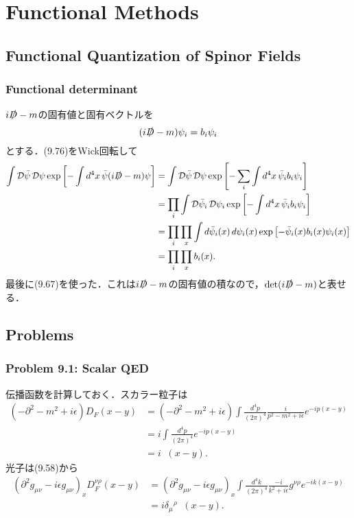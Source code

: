 \renewcommand\theequation{\arabic{chapter}.\arabic{section}.\arabic{equation}}
\setcounter{chapter}{8}
\chapter{Functional Methods}
\setcounter{section}{4}
\section{Functional Quantization of Spinor Fields}
\subsection{Functional determinant}
$i\slashed{D}-m$の固有値と固有ベクトルを
\[ (i\slashed{D}-m)\psi_i = b_i \psi_i \]
とする．(9.76)をWick回転して
\begin{align*}
  \int\mathcal{D}\bar\psi \, \mathcal{D}\psi \exp \left[ - \int d^4x \, \bar\psi (i\slashed{D}-m)\psi \right]
  &= \int\mathcal{D}\bar\psi \, \mathcal{D}\psi \exp \left[ - \sum_i \int d^4x \, \bar\psi_i b_i \psi_i \right] \\
  &= \prod_i \int\mathcal{D}\bar\psi_i \, \mathcal{D}\psi_i \exp \left[ - \int d^4x \, \bar\psi_i b_i \psi_i \right] \\
  &= \prod_i \prod_x \int d\bar\psi_i(x) \, d\psi_i(x) \exp \left[ - \bar\psi_i(x) b_i(x) \psi_i(x) \right] \\
  &= \prod_i \prod_x b_i(x) .
\end{align*}
最後に(9.67)を使った．これは$i\slashed{D}-m$の固有値の積なので，$\det(i\slashed{D}-m)$と表せる．

\section*{Problems}
\subsection{Problem 9.1: Scalar QED}
伝播函数を計算しておく．スカラー粒子は
\begin{align*}
  (-\partial^2 - m^2 + i\epsilon) D_F(x-y) &= (-\partial^2 - m^2 + i\epsilon) \int \frac{d^4p}{(2\pi)^4}
  \frac{i}{p^2 - m^2 + i\epsilon} e^{-ip(x-y)} \\
  &= i \int \frac{d^4p}{(2\pi)^4} e^{-ip(x-y)} \\
  &= i \mathop{\delta^{(4)}} (x-y) .
\end{align*}
光子は(9.58)から
\begin{align*}
  (\partial^2 g_{\mu\nu} - i\epsilon g_{\mu\nu})_x D_F^{\nu\rho}(x-y)
  &= (\partial^2 g_{\mu\nu} - i\epsilon g_{\mu\nu})_x \int \frac{d^4k}{(2\pi)^4} \frac{-i}{k^2 + i\epsilon} g^{\nu\rho} e^{-ik(x-y)} \\
  &= i \delta_\mu{}^\rho \mathop{\delta^{(4)}} (x-y) .
\end{align*}

